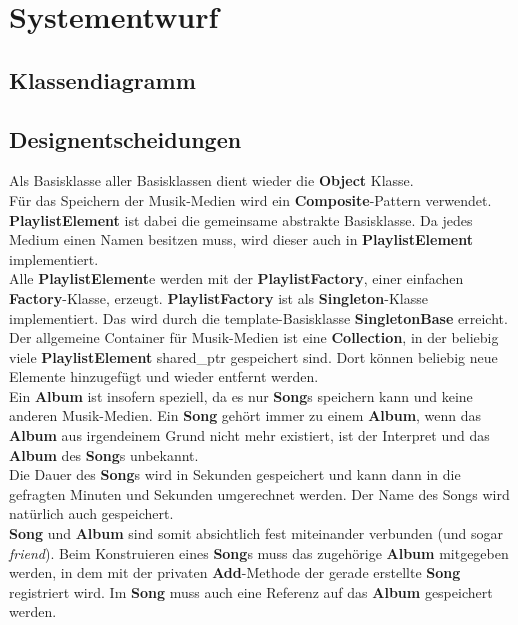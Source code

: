 \section{Systementwurf}

\subsection{Klassendiagramm}

\subsection{Designentscheidungen}

Als Basisklasse aller Basisklassen dient wieder die \textbf{Object} Klasse.\\

Für das Speichern der Musik-Medien wird ein \textbf{Composite}-Pattern verwendet. \textbf{PlaylistElement} ist dabei die gemeinsame abstrakte Basisklasse. Da jedes Medium einen Namen besitzen muss, wird dieser auch in \textbf{PlaylistElement} implementiert.\\

Alle \textbf{PlaylistElement}e werden mit der \textbf{PlaylistFactory}, einer einfachen \textbf{Factory}-Klasse, erzeugt. \textbf{PlaylistFactory} ist als \textbf{Singleton}-Klasse implementiert. Das wird durch die template-Basisklasse \textbf{SingletonBase} erreicht.\\

Der allgemeine Container für Musik-Medien ist eine \textbf{Collection}, in der beliebig viele \textbf{PlaylistElement} shared\_ptr gespeichert sind. Dort können beliebig neue Elemente hinzugefügt und wieder entfernt werden.\\

Ein \textbf{Album} ist insofern speziell, da es nur \textbf{Song}s speichern kann und keine anderen Musik-Medien. Ein \textbf{Song} gehört immer zu einem \textbf{Album}, wenn das \textbf{Album} aus irgendeinem Grund nicht mehr existiert, ist der Interpret und das \textbf{Album} des \textbf{Song}s unbekannt.\\ 

Die Dauer des \textbf{Song}s wird in Sekunden gespeichert und kann dann in die gefragten Minuten und Sekunden umgerechnet werden. Der Name des Songs wird natürlich auch gespeichert.\\ \textbf{Song} und \textbf{Album} sind somit absichtlich fest miteinander verbunden (und sogar \textit{friend}). Beim Konstruieren eines \textbf{Song}s muss das zugehörige \textbf{Album} mitgegeben werden, in dem mit der privaten \textbf{Add}-Methode der gerade erstellte \textbf{Song} registriert wird. Im \textbf{Song} muss auch eine Referenz auf das \textbf{Album} gespeichert werden.\\ 


